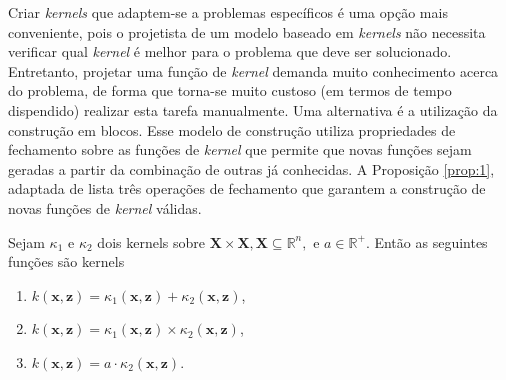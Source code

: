 
Criar \textit{kernels} que adaptem-se a problemas específicos é uma opção mais conveniente, pois o projetista de um modelo baseado em \textit{kernels} não necessita verificar qual \textit{kernel} é melhor para o problema que deve ser solucionado. Entretanto, projetar uma função de \textit{kernel} demanda muito conhecimento acerca do problema, de forma que torna-se muito custoso (em termos de tempo dispendido) realizar esta tarefa manualmente. Uma alternativa é a utilização da construção em blocos. Esse modelo de construção utiliza propriedades de fechamento sobre as funções de \textit{kernel} que permite que novas funções sejam geradas a partir da combinação de outras já conhecidas. A Proposição \ref{prop:1}, adaptada de \cite{shawe2004} lista três operações de fechamento que garantem a construção de novas funções de \textit{kernel} válidas.

\begin{proposition}
    \label{prop:1}
    Sejam $\kappa_1$ e $\kappa_2$ dois kernels sobre $\mathbf{X} \times \mathbf{X}, \mathbf{X} \subseteq
    \mathbb{R}^n,$ e $a \in \mathbb{R}^+$. Então as seguintes funções são kernels

    \begin{enumerate}[label=(\roman*)]
        \item $k(\mathbf{x},\mathbf{z}) = \kappa_1(\mathbf{x},\mathbf{z}) + \kappa_2(\mathbf{x},\mathbf{z})$,
        \item $k(\mathbf{x},\mathbf{z}) = \kappa_1(\mathbf{x},\mathbf{z}) \times \kappa_2(\mathbf{x},\mathbf{z})$,
        \item $k(\mathbf{x},\mathbf{z}) = a \cdot \kappa_2(\mathbf{x},\mathbf{z})$.
    \end{enumerate}
\end{proposition}

